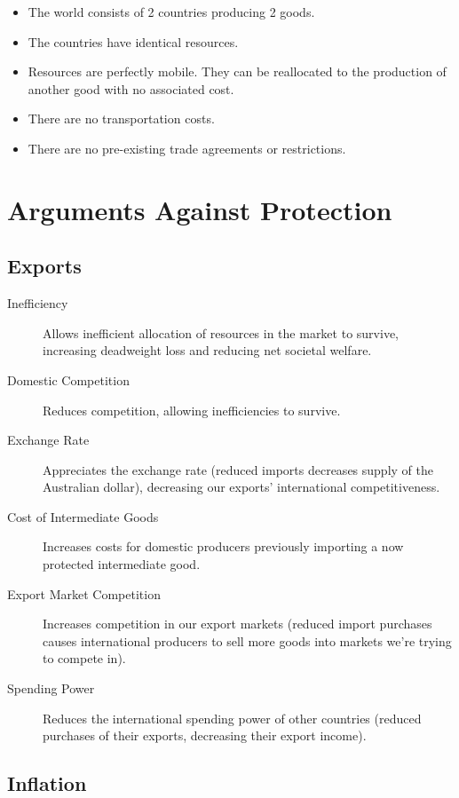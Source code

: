 \documentclass[a4paper,11pt]{report}
\begin{document}
\begin{itemize}
\item The world consists of 2 countries producing 2 goods.
\item The countries have identical resources.
\item Resources are perfectly mobile. They can be reallocated to the production
of another good with no associated cost.
\item There are no transportation costs.
\item There are no pre-existing trade agreements or restrictions.
\end{itemize}


\section{Arguments Against Protection}

\subsection{Exports}

\begin{description}
\item [Inefficiency] Allows inefficient allocation of resources in the market
	to survive, increasing deadweight loss and reducing net societal welfare.
\item [Domestic Competition] Reduces competition, allowing inefficiencies to
	survive.
\item [Exchange Rate] Appreciates the exchange rate (reduced imports decreases
	supply of the Australian dollar), decreasing our exports' international
	competitiveness.
\item [Cost of Intermediate Goods] Increases costs for domestic producers
	previously importing a now protected intermediate good.
\item [Export Market Competition] Increases competition in our export markets
	(reduced import purchases causes international producers to sell more goods
	into markets we're trying to compete in).
\item [Spending Power] Reduces the international spending power of other
	countries (reduced purchases of their exports, decreasing their export
	income).
\end{description}

\subsection{Inflation}
\end{document}
